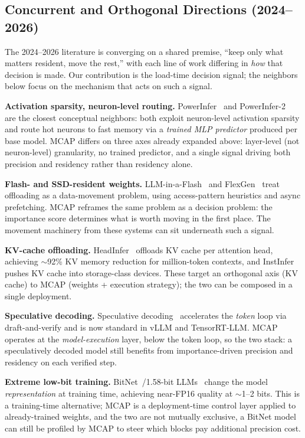 \documentclass{article}
\begin{document}
\subsection{Concurrent and Orthogonal Directions (2024--2026)}
\label{sec:landscape}

The 2024--2026 literature is converging on a shared premise, ``keep
only what matters resident, move the rest,'' with each line of work
differing in \emph{how} that decision is made. Our contribution is the
load-time decision signal; the neighbors below focus on the mechanism
that acts on such a signal.

\textbf{Activation sparsity, neuron-level routing.}
PowerInfer~\cite{song2024powerinfer} and PowerInfer-2~\cite{xue2024powerinfer2}
are the closest conceptual neighbors: both exploit neuron-level activation
sparsity and route hot neurons to fast memory via a \emph{trained MLP
predictor} produced per base model. MCAP differs on three axes already expanded above:
layer-level (not neuron-level) granularity, no trained predictor, and a single
signal driving both precision and residency rather than residency alone.

\textbf{Flash- and SSD-resident weights.}
LLM-in-a-Flash~\cite{alizadeh2024llmflash} and FlexGen~\cite{sheng2023flexgen}
treat offloading as a data-movement problem, using access-pattern
heuristics and async prefetching. MCAP reframes the same problem as a
decision problem: the importance score determines what is worth moving
in the first place. The movement machinery from these systems can sit
underneath such a signal.

\textbf{KV-cache offloading.}
HeadInfer~\cite{luo2025headinfer} offloads KV cache per attention head, achieving
$\sim$92\% KV memory reduction for million-token contexts, and
InstInfer~\cite{pan2024instinfer} pushes KV cache into storage-class devices.
These target an orthogonal axis (KV cache) to MCAP (weights + execution strategy);
the two can be composed in a single deployment.

\textbf{Speculative decoding.}
Speculative decoding~\cite{leviathan2023speculative,chen2023speculative} accelerates
the \emph{token} loop via draft-and-verify and is now standard in vLLM and
TensorRT-LLM. MCAP operates at the \emph{model-execution} layer, below the token
loop, so the two stack: a speculatively decoded model still benefits from
importance-driven precision and residency on each verified step.

\textbf{Extreme low-bit training.}
BitNet~/1.58-bit LLMs~\cite{ma2024bitnet158} change the model \emph{representation}
at training time, achieving near-FP16 quality at $\sim$1--2 bits. This is a
training-time alternative; MCAP is a deployment-time control layer applied to
already-trained weights, and the two are not mutually exclusive, a BitNet model
can still be profiled by MCAP to steer which blocks pay additional precision cost.
\end{document}
